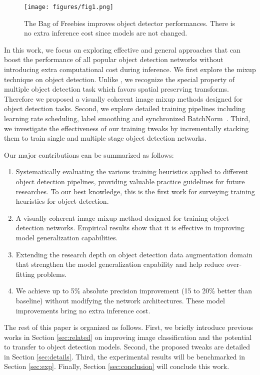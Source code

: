 \documentclass[10pt,twocolumn,letterpaper]{article}
\begin{document}
\begin{figure}[t!]
  \centering
    \texttt{[image: figures/fig1.png]}
  \caption{The Bag of Freebies improves object detector performances. There is no extra inference cost since models are not changed.}
  \label{fig:highlights}
\end{figure}

In this work, we focus on exploring effective and general approaches that can boost the performance of all popular object detection networks without introducing extra computational cost during inference. We first explore the mixup technique on object detection. Unlike \cite{zhang2017mixup}, we recognize the special property of multiple object detection task which favors spatial preserving transforms. Therefore we proposed a visually coherent image mixup methods designed for object detection tasks. Second, we explore detailed training pipelines including learning rate scheduling, label smoothing and synchronized BatchNorm~\cite{Zhang_2018_CVPR,peng2018megdet}. Third, we investigate the effectiveness of our training tweaks by incrementally stacking them to train single and multiple stage object detection networks.



Our major contributions can be summarized as follows:

\begin{enumerate}[itemsep=0mm]
    \item Systematically evaluating the various training heuristics applied to different object detection pipelines, providing valuable practice guidelines for future researches. To our best knowledge, this is the first work for surveying training heuristics for object detection.
    \item A visually coherent image mixup method designed for training object detection networks. Empirical results show that it is effective in improving model generalization capabilities.
    \item Extending the research depth on object detection data augmentation domain that strengthen the model generalization capability and help reduce over-fitting problems. 
    \item We achieve up to 5\% absolute precision improvement (15 to 20\% better than baseline) without modifying the network architectures. These model improvements bring no extra inference cost.
\end{enumerate}

The rest of this paper is organized as follows. First, we briefly introduce previous works in Section \ref{sec:related} on improving image classification and the potential to transfer to object detection models. Second, the proposed tweaks are detailed in Section \ref{sec:details}. Third, the experimental results will be benchmarked in Section \ref{sec:exp}. Finally, Section \ref{sec:conclusion} will conclude this work.
\end{document}
